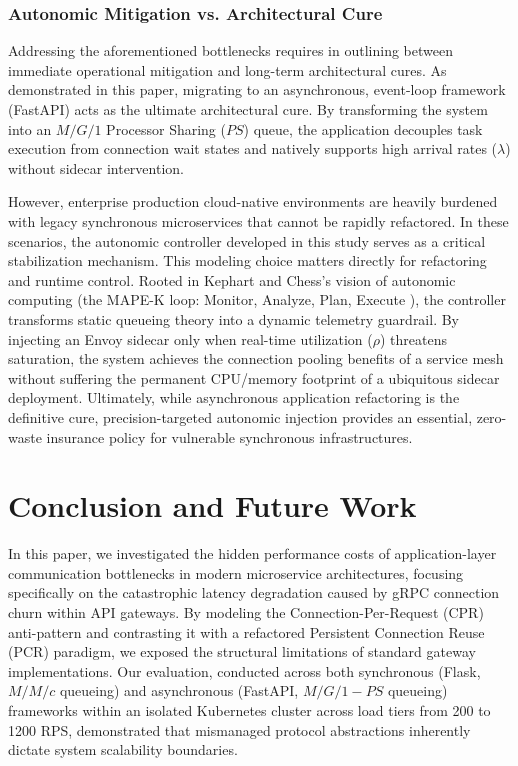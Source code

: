 \documentclass{ieeeaccess}
\begin{document}
\subsubsection{Autonomic Mitigation vs. Architectural Cure}
Addressing the aforementioned bottlenecks requires in outlining between immediate operational mitigation and long-term architectural cures. As demonstrated in this paper, migrating to an asynchronous, event-loop framework (FastAPI) acts as the ultimate architectural cure. By transforming the system into an $M/G/1$ Processor Sharing ($PS$) queue, the application decouples task execution from connection wait states and natively supports high arrival rates ($\lambda$) without sidecar intervention.

However, enterprise production cloud-native environments are heavily burdened with legacy synchronous microservices that cannot be rapidly refactored. In these scenarios, the autonomic controller developed in this study serves as a critical stabilization mechanism. This modeling choice matters directly for refactoring and runtime control. Rooted in Kephart and Chess’s vision of autonomic computing \cite{kephart2003vision} (the MAPE-K loop: Monitor, Analyze, Plan, Execute \cite{armstrong2017towards}), the controller transforms static queueing theory into a dynamic telemetry guardrail. By injecting an Envoy sidecar only when real-time utilization ($\rho$) threatens saturation, the system achieves the connection pooling benefits of a service mesh without suffering the permanent CPU/memory footprint of a ubiquitous sidecar deployment. Ultimately, while asynchronous application refactoring is the definitive cure, precision-targeted autonomic injection provides an essential, zero-waste insurance policy for vulnerable synchronous infrastructures.

\section{Conclusion and Future Work}
\label{sec:conclude}

In this paper, we investigated the hidden performance costs of application-layer communication bottlenecks in modern microservice architectures, focusing specifically on the catastrophic latency degradation caused by gRPC connection churn within API gateways. By modeling the Connection-Per-Request (CPR) anti-pattern and contrasting it with a refactored Persistent Connection Reuse (PCR) paradigm, we exposed the structural limitations of standard gateway implementations. Our evaluation, conducted across both synchronous (Flask, $M/M/c$ queueing) and asynchronous (FastAPI, $M/G/1-PS$ queueing) frameworks within an isolated Kubernetes cluster across load tiers from 200 to 1200 RPS, demonstrated that mismanaged protocol abstractions inherently dictate system scalability boundaries. 
\end{document}
